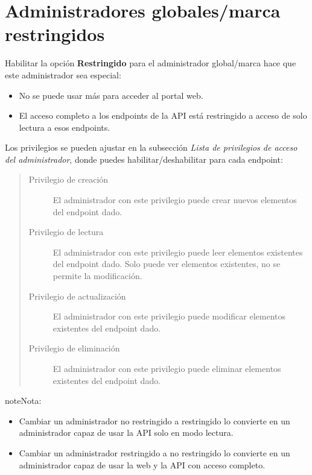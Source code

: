\documentclass[letterpaper,10pt,spanish]{sphinxmanual}
\begin{document}
\section{Administradores globales/marca restringidos}
\label{api_rest/acls:restricted-global-brand-administrators}
Habilitar la opción \textbf{Restringido} para el administrador global/marca hace que este administrador sea especial:
\begin{itemize}
\item {} 
No se puede usar más para acceder al portal web.

\item {} 
El acceso completo a los endpoints de la API está restringido a acceso de solo lectura a esos endpoints.

\end{itemize}

Los privilegios se pueden ajustar en la subsección \emph{Lista de privilegios de acceso del administrador}, donde puedes habilitar/deshabilitar para cada endpoint:
\begin{quote}
\begin{description}
\item[{Privilegio de creación}] \leavevmode
El administrador con este privilegio puede crear nuevos elementos del endpoint dado.

\item[{Privilegio de lectura}] \leavevmode
El administrador con este privilegio puede leer elementos existentes del endpoint dado. Solo puede ver elementos existentes, no se permite la modificación.

\item[{Privilegio de actualización}] \leavevmode
El administrador con este privilegio puede modificar elementos existentes del endpoint dado.

\item[{Privilegio de eliminación}] \leavevmode
El administrador con este privilegio puede eliminar elementos existentes del endpoint dado.

\end{description}
\end{quote}

\begin{notice}{note}{Nota:}\begin{itemize}
\item {} 
Cambiar un administrador no restringido a restringido lo convierte en un administrador capaz de usar la API solo en modo lectura.

\item {} 
Cambiar un administrador restringido a no restringido lo convierte en un administrador capaz de usar la web y la API con acceso completo.

\end{itemize}
\end{notice}
\end{document}
